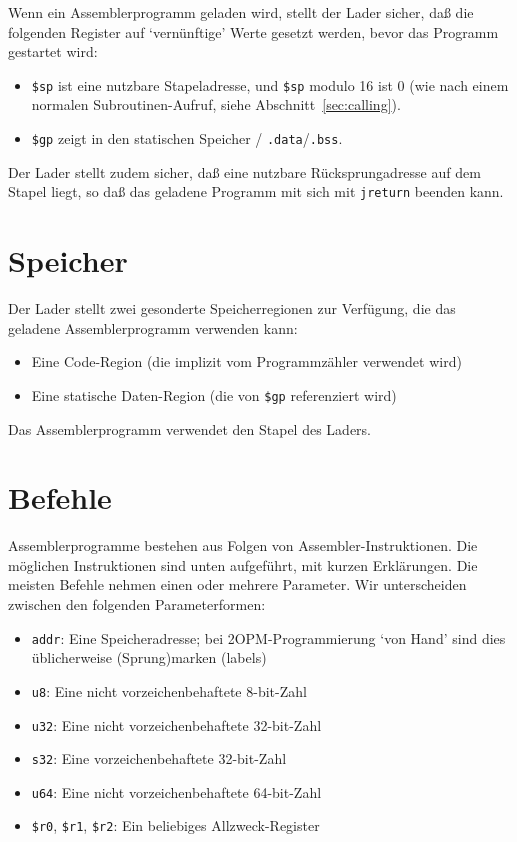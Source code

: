 \documentclass[11pt,a4paper]{article}
\begin{document}
Wenn ein Assemblerprogramm geladen wird, stellt der Lader sicher, daß die folgenden Register auf `vernünftige' Werte gesetzt werden,
bevor das Programm gestartet wird:
\begin{itemize}
  \item \texttt{\$sp} ist eine nutzbare Stapeladresse, und \texttt{\$sp} modulo 16 ist 0 (wie nach einem normalen Subroutinen-Aufruf, siehe Abschnitt~\ref{sec:calling}).
  \item \texttt{\$gp} zeigt in den statischen Speicher / \texttt{.data}/\texttt{.bss}.
\end{itemize}
Der Lader stellt zudem sicher, daß eine nutzbare Rücksprungadresse auf dem Stapel liegt, so daß das geladene Programm mit
sich mit \texttt{jreturn} beenden kann.

\section{Speicher}
Der Lader stellt zwei gesonderte Speicherregionen zur Verfügung, die das geladene Assemblerprogramm verwenden kann:
\begin{itemize}
\item Eine Code-Region (die implizit vom Programmzähler verwendet wird)
\item Eine statische Daten-Region (die von \texttt{\$gp} referenziert wird)
\end{itemize}
Das Assemblerprogramm verwendet den Stapel des Laders.

\section{Befehle}

Assemblerprogramme bestehen aus Folgen von Assembler-Instruktionen.  Die möglichen Instruktionen sind unten aufgeführt, mit kurzen Erklärungen.
Die meisten Befehle nehmen einen oder mehrere Parameter.  Wir unterscheiden zwischen den folgenden Parameterformen:
\begin{itemize}
  \item \texttt{addr}: Eine Speicheradresse; bei 2OPM-Programmierung `von Hand' sind dies üblicherweise (Sprung)marken (labels)
  \item \texttt{u8}: Eine nicht vorzeichenbehaftete 8-bit-Zahl
  \item \texttt{u32}: Eine nicht vorzeichenbehaftete 32-bit-Zahl
  \item \texttt{s32}: Eine vorzeichenbehaftete 32-bit-Zahl
  \item \texttt{u64}: Eine nicht vorzeichenbehaftete 64-bit-Zahl
  \item \texttt{\$r0}, \texttt{\$r1}, \texttt{\$r2}: Ein beliebiges Allzweck-Register
\end{itemize}
\end{document}
